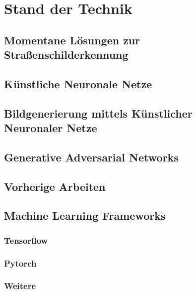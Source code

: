\chapter{Stand der Technik}
\section{Momentane Lösungen zur Straßenschilderkennung}

\section{Künstliche Neuronale Netze}


\section{Bildgenerierung mittels Künstlicher Neuronaler Netze}


\section{Generative Adversarial Networks}


\section{Vorherige Arbeiten}
\cite{gtsrbGAN}
\cite{taiwanGAN}

\section{Machine Learning Frameworks}
\subsection{Tensorflow}
\subsection{Pytorch}
\subsection{Weitere}
